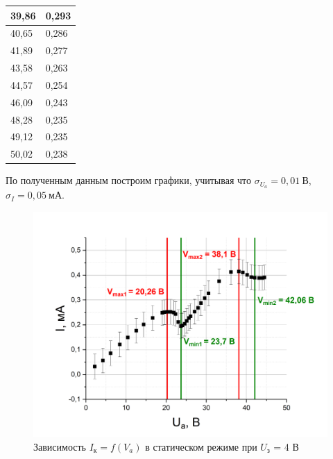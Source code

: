 \documentclass[a4paper,12pt]{article}
\begin{document}
\begin{table}[h]
\begin{minipage}{0.3\textwidth}
\begin{tabular}{|ll|}
\multicolumn{1}{|l|}{39,86} & 0,293 \\ \hline
\multicolumn{1}{|l|}{40,65} & 0,286 \\ \hline
\multicolumn{1}{|l|}{41,89} & 0,277 \\ \hline
\multicolumn{1}{|l|}{43,58} & 0,263 \\ \hline
\multicolumn{1}{|l|}{44,57} & 0,254 \\ \hline
\multicolumn{1}{|l|}{46,09} & 0,243 \\ \hline
\multicolumn{1}{|l|}{48,28} & 0,235 \\ \hline
\multicolumn{1}{|l|}{49,12} & 0,235 \\ \hline
\multicolumn{1}{|l|}{50,02} & 0,238 \\ \hline
\end{tabular}
\end{minipage}
\end{table}	

По полученным данным построим графики, учитывая что $\sigma_{U_a} = 0,01 \ В$, $\sigma_{I} = 0,05 \ мА $.

\newpage

\begin{figure}[h!]
	\centering
	\includegraphics[scale=0.5]{graph1}
	\caption{Зависимость $I_к = f(V_a)$ в статическом режиме при $U_з$ = 4 В}
	\label{graph1}
\end{figure}
\end{document}
